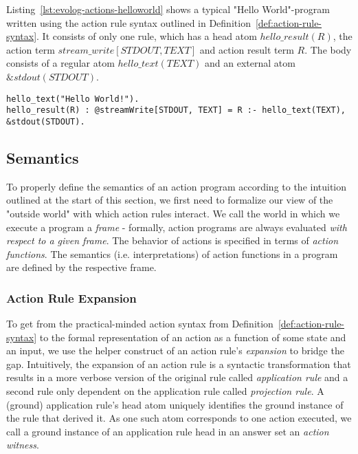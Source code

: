 \begin{example}
Listing~\ref{lst:evolog-actions-helloworld} shows a typical "Hello World"-program written using the action rule syntax outlined in Definition~\ref{def:action-rule-syntax}. It consists of only one rule, which has a head atom $hello\_result(R)$, the action term $stream\_write[STDOUT, TEXT]$ and action result term $R$. The body consists of a regular atom $hello\_text(TEXT)$ and an external atom $\&stdout(STDOUT)$.
\begin{lstlisting}[style=asp-code, label={lst:evolog-actions-helloworld}, caption={A "Hello World"-program in Evolog.}]
hello_text("Hello World!").
hello_result(R) : @streamWrite[STDOUT, TEXT] = R :- hello_text(TEXT), &stdout(STDOUT).	
\end{lstlisting}
\end{example}	

\subsection{Semantics}
\label{subsec:evolog-actions-semantics}

To properly define the semantics of an action program according to the intuition outlined at the start of this section, we first need to formalize our view of the "outside world" with which action rules interact. We call the world in which we execute a program a \emph{frame} - formally, action programs are always evaluated \emph{with respect to a given frame}. The behavior of actions is specified in terms of \emph{action functions}. The semantics (i.e. interpretations) of action functions in a program are defined by the respective frame.

\subsubsection{Action Rule Expansion}
\label{subsubsec:evolog-actions-semantics-expansion}

To get from the practical-minded action syntax from Definition~\ref{def:action-rule-syntax} to the formal representation of an action as a function of some state and an input, we use the helper construct of an action rule's \emph{expansion} to bridge the gap. Intuitively, the expansion of an action rule is a syntactic transformation that results in a more verbose version of the original rule called \emph{application rule} and a second rule only dependent on the application rule called \emph{projection rule}. A (ground) application rule's head atom uniquely identifies the ground instance of the rule that derived it. As one such atom corresponds to one action executed, we call a ground instance of an application rule head in an answer set an \emph{action witness}. 

